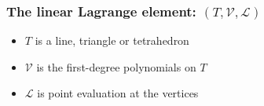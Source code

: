 \begin{frame}
  \frametitle{The linear Lagrange element: $(T, \mathcal{V}, \mathcal{L})$}

  \begin{itemize}
  \item
    $T$ is a line, triangle or tetrahedron
  \item
    $\mathcal{V}$ is the first-degree polynomials on $T$
  \item
    $\mathcal{L}$ is point evaluation at the vertices
  \end{itemize}

\end{frame}
